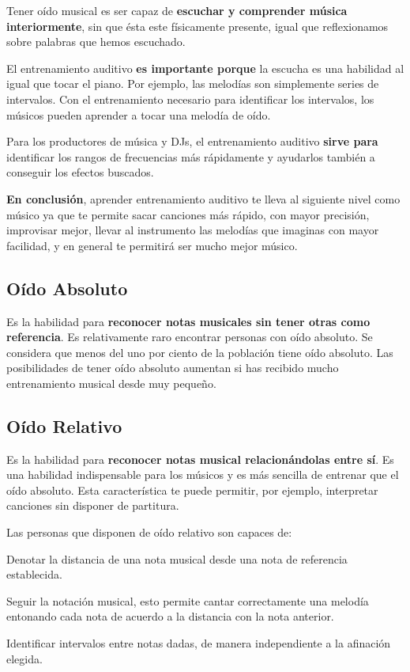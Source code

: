 \documentclass[12pt,twoside,titlepage]{report}
\begin{document}
Tener oído musical es ser capaz de \textbf{escuchar y comprender música interiormente}, sin que ésta este físicamente presente, igual que reflexionamos sobre palabras que hemos escuchado.

El entrenamiento auditivo \textbf{es importante porque} la escucha es una habilidad al igual que tocar el piano. Por ejemplo, las melodías son simplemente series de intervalos. Con el entrenamiento necesario para identificar los intervalos, los músicos pueden aprender a tocar una melodía de oído.

Para los productores de música y DJs, el entrenamiento auditivo \textbf{sirve para} identificar los rangos de frecuencias más rápidamente y ayudarlos también a conseguir los efectos buscados.

\textbf{En conclusión}, aprender entrenamiento auditivo te lleva al siguiente nivel como músico ya que te permite sacar canciones más rápido, con mayor precisión, improvisar mejor, llevar al instrumento las melodías que imaginas con mayor facilidad, y en general te permitirá ser mucho mejor músico.

\subsection{Oído Absoluto}

Es la habilidad para \textbf{reconocer notas musicales sin tener otras como referencia}. Es relativamente raro encontrar personas con oído absoluto. Se considera que menos del uno por ciento de la población tiene oído absoluto. Las posibilidades de tener oído absoluto aumentan si has recibido mucho entrenamiento musical desde muy pequeño.

\subsection{Oído Relativo}

Es la habilidad para \textbf{reconocer notas musical relacionándolas entre sí}. Es una habilidad indispensable para los músicos y es más sencilla de entrenar que el oído absoluto. Esta característica te puede permitir, por ejemplo, interpretar canciones sin disponer de partitura.

Las personas que disponen de oído relativo son capaces de:
\begin{compactitem}
    \item Denotar la distancia de una nota musical desde una nota de referencia establecida.
    \item Seguir la notación musical, esto permite cantar correctamente una melodía entonando cada nota de acuerdo a la distancia con la nota anterior.
    \item Identificar intervalos entre notas dadas, de manera independiente a la afinación elegida.
\end{compactitem}
\end{document}
